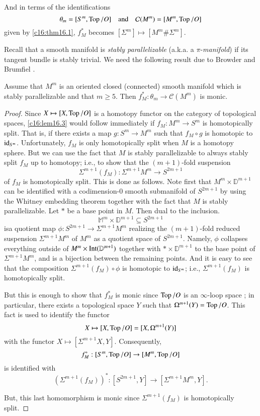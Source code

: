 And in terms of the identifications
$$
\theta_{m}=[S^{m},\operatorname{Top}/O]\quad\text{and}\quad
\mathcal{C}(M^{m})=[M^{m},\operatorname{Top}/O] 
$$
given by \ref{c16:thm16.1}, $f^{*}_{M}$ becomes $[\Sigma^{m}]\mapsto
[M^{m}\# \Sigma^{m}]$. 

Recall that a smooth manifold is {\em stably parallelizable} (a.k.a.\@
a $\pi$-{\em manifold}) if its tangent bundle is stably trivial. We
need the following result due to Browder \cite{13} and Brumfiel
\cite{14}.

\begin{lemma}\label{c16:lem16.3}
Assume that $M^{m}$ is an oriented closed (connected) smooth manifold
which is stably parallelizable and that $m\geq 5$. Then
$f^{*}_{M}:\theta_{m}\to \mathcal{C}(M^{m})$ is monic.
\end{lemma}

\begin{proof}
Since $X\mapsto [X,\operatorname{Top}/O]$ is a homotopy functor on the category of
topological spaces, \ref{c16:lem16.3} would follow immediately if
$f_{M}:M^{m}\to S^{m}$ is homotopically split. That is, if there
exists a map $g:S^{m}\to M^{m}$ such that $f_{M}\circ g$ is homotopic
to $\operatorname{id}_{S^{m}}$. Unfortunately, $f_{M}$ is only homotopically split
when $M$ is a homotopy sphere. But we can use the fact that $M$ is
stably parallelizable to always stably split $f_{M}$ up to homotopy;
i.e., to show that the $(m+1)$-fold suspension
$$
\Sigma^{m+1}(f_{M}):\Sigma^{m+1}M^{m}\to S^{2m+1}
$$
of $f_{M}$ is homotopically split. This is done as follows. Note first
that $M^{m}\times \mathbb{D}^{m+1}$ can be identified with a
codimension-0 smooth submanifold of $S^{2m+1}$ by using the Whitney
embedding theorem together with the fact that $M$ is stably
parallelizable. Let $\ast$ be a base point in $M$. Then dual to the
inclusion. 
$$
\mathbb{M}^{m}\times \mathbb{D}^{m+1}\subseteq S^{2m+1}
$$
is\pageoriginale a quotient map $\phi:S^{2m+1}\to \Sigma^{m+1}M^{m}$
realizing the $(m+1)$-fold reduced suspension $\Sigma^{m+1}M^{m}$ of
$M^{m}$ as a quotient space of $S^{2m+1}$. Namely, $\phi$ collapses
everything outside of $M^{m}\times \operatorname{Int}(\mathbb{D}^{m+1})$ together
with $\ast\times \mathbb{D}^{m+1}$ to the base point of
$\Sigma^{m+1}M^{m}$, and is a bijection between the remaining
points. And it is easy to see that the composition
$\Sigma^{m+1}(f_{M})\circ \phi$ is homotopic to $\operatorname{id}_{S^{m}}$; i.e.,
$\Sigma^{m+1}(f_{M})$ is homotopically split.

But this is enough to show that $f^{*}_{M}$ is monic since $\operatorname{Top}/O$
is an $\infty$-loop space \cite{8}; in particular, there exists a
topological space $Y$ such that $\Omega^{m+1}(Y)=\operatorname{Top}/O$. This fact
is used to identify the functor
$$
X\mapsto [X,\operatorname{Top}/O]=[X,\Omega^{m+1}(Y)]
$$
with the functor $X\mapsto [\Sigma^{m+1}X,Y]$. Consequently,
$$
f^{*}_{M}:[S^{m},\operatorname{Top}/O]\to [M^{m},\operatorname{Top}/O]
$$
is identified with 
$$
(\Sigma^{m+1}(f_{M}))^{*}:[S^{2m+1},Y]\to [\Sigma^{m+1}M^{m},Y].
$$

But, this last homomorphism is monic since $\Sigma^{m+1}(f_{M})$ is
homotopically split.
\end{proof}

